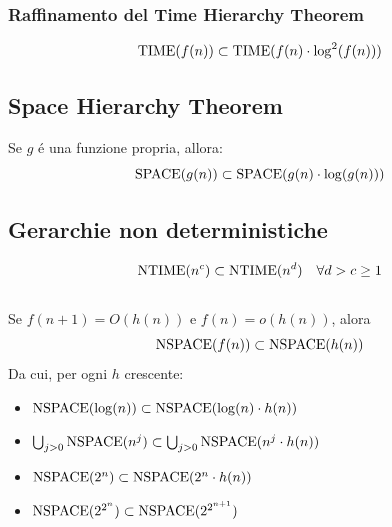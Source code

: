 \subsubsection*{Raffinamento del Time Hierarchy Theorem}
\[\text{TIME}(f(n)) \subset \text{TIME}(f(n) \cdot \log^2(f(n)))\]

\subsection{Space Hierarchy Theorem}
Se $g$ é una funzione propria, allora:
\[\text{SPACE}(g(n)) \subset \text{SPACE}(g(n) \cdot \log(g(n)))\]


\subsection{Gerarchie non deterministiche}
\[\text{NTIME}(n^c) \subset \text{NTIME}(n^d) \quad \forall d > c \geq 1\] \\

Se $f(n+1) = O(h(n))$ e $f(n) = o(h(n))$, alora \\
\[\text{NSPACE}(f(n)) \subset \text{NSPACE}(h(n))\]
Da cui, per ogni $h$ crescente:
\begin{itemize}
    \item $\text{NSPACE}(\log(n)) \subset \text{NSPACE}(\log(n) \cdot h(n))$
    \item $\bigcup_{j>0} \text{NSPACE}(n^j) \subset \bigcup_{j>0} \text{NSPACE}(n^j \cdot h(n))$
    \item $\text{NSPACE}(2^n) \subset \text{NSPACE}(2^n \cdot h(n))$
    \item $\text{NSPACE}(2^{2^n}) \subset \text{NSPACE}(2^{2^{n+1}})$
\end{itemize}